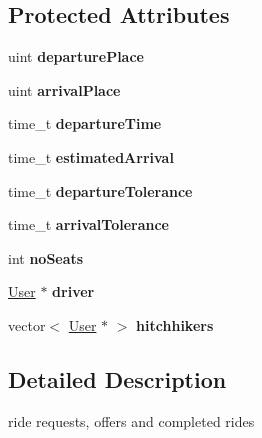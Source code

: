 \subsection*{Protected Attributes}
\begin{DoxyCompactItemize}
\item 
\hypertarget{class_ride_a176632238cfffb2d7fc889d233261fa0}{}uint {\bfseries departure\+Place}\label{class_ride_a176632238cfffb2d7fc889d233261fa0}

\item 
\hypertarget{class_ride_a9d3d96a9aeb76232bc07c52461cdc4ac}{}uint {\bfseries arrival\+Place}\label{class_ride_a9d3d96a9aeb76232bc07c52461cdc4ac}

\item 
\hypertarget{class_ride_ac3dd5b37d7ba828e6635a944425e6ace}{}time\+\_\+t {\bfseries departure\+Time}\label{class_ride_ac3dd5b37d7ba828e6635a944425e6ace}

\item 
\hypertarget{class_ride_ad4e0009e20129189e804b8cf7ad1766a}{}time\+\_\+t {\bfseries estimated\+Arrival}\label{class_ride_ad4e0009e20129189e804b8cf7ad1766a}

\item 
\hypertarget{class_ride_a668eeee90fb137d28ca2ce84345237bd}{}time\+\_\+t {\bfseries departure\+Tolerance}\label{class_ride_a668eeee90fb137d28ca2ce84345237bd}

\item 
\hypertarget{class_ride_ab6932b92492a60844ac831380ebf2e0d}{}time\+\_\+t {\bfseries arrival\+Tolerance}\label{class_ride_ab6932b92492a60844ac831380ebf2e0d}

\item 
\hypertarget{class_ride_a3e8ba79aefe64707fabfec0eed092784}{}int {\bfseries no\+Seats}\label{class_ride_a3e8ba79aefe64707fabfec0eed092784}

\item 
\hypertarget{class_ride_ad3855a5fce1f26c871ae3c70dfee6137}{}\hyperlink{class_user}{User} $\ast$ {\bfseries driver}\label{class_ride_ad3855a5fce1f26c871ae3c70dfee6137}

\item 
\hypertarget{class_ride_a0b0d7418f91b2991c199901b6cf48801}{}vector$<$ \hyperlink{class_user}{User} $\ast$ $>$ {\bfseries hitchhikers}\label{class_ride_a0b0d7418f91b2991c199901b6cf48801}

\end{DoxyCompactItemize}


\subsection{Detailed Description}
ride requests, offers and completed rides 

